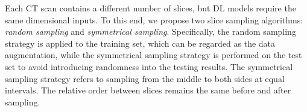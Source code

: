 \documentclass[letterpaper]{article}
\begin{document}
    


Each CT scan contains a different number of slices, but DL models require the same dimensional inputs. To this end, we propose two slice sampling algorithms: \textit{random sampling} and \textit{symmetrical sampling}. Specifically, the random sampling strategy is applied to the training set, which can be regarded as the data augmentation, while the symmetrical sampling strategy is performed on the test set to avoid introducing randomness into the testing results. The symmetrical sampling strategy refers to sampling from the middle to both sides at equal intervals. The relative order between slices remains the same before and after sampling. 

\end{document}
